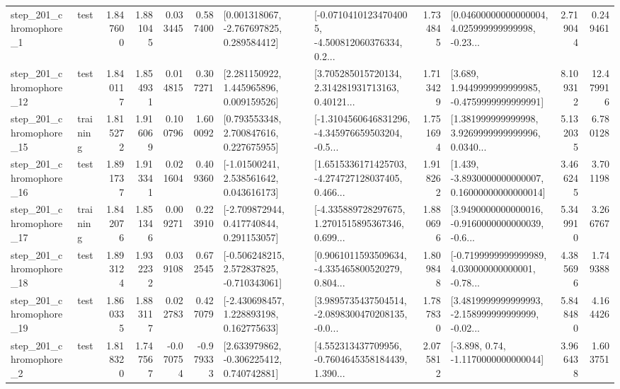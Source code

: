 \begin{tabular}{llrrrrllrlrr}
   step\_201\_chromophore\_1 &      test &      1.847600 &    1.881045 &      0.033445 &  0.587400 &    [0.001318067, -2.767697825, 0.289584412] &  [-0.07104101234704005, -4.500812060376334, 0.2... &       1.734845 &  [0.04600000000000004, 4.025999999999998, -0.23... &            2.719044 &          0.249461 \\
  step\_201\_chromophore\_12 &      test &      1.840117 &    1.854931 &      0.014815 &  0.307271 &     [2.281150922, 1.445965896, 0.009159526] &  [3.705285015720134, 2.314281931713163, 0.40121... &       1.713429 &   [3.689, 1.9449999999999985, -0.4759999999999991] &            8.109312 &         12.479916 \\
  step\_201\_chromophore\_15 &  training &      1.815272 &    1.916069 &      0.100796 &  1.600092 &     [0.793553348, 2.700847616, 0.227675955] &  [-1.3104560646831296, -4.345976659503204, -0.5... &       1.751694 &  [1.381999999999998, 3.9269999999999996, 0.0340... &            5.132035 &          6.780128 \\
  step\_201\_chromophore\_16 &      test &      1.891737 &    1.913341 &      0.021604 &  0.409360 &     [-1.01500241, 2.538561642, 0.043616173] &  [1.6515336171425703, -4.274727128037405, 0.466... &       1.918262 &  [1.439, -3.8930000000000007, 0.16000000000000014] &            3.466245 &          3.701198 \\
  step\_201\_chromophore\_17 &  training &      1.842076 &    1.851346 &      0.009271 &  0.223910 &    [-2.709872944, 0.417740844, 0.291153057] &  [-4.335889728297675, 1.2701515895367346, 0.699... &       1.880696 &  [3.9490000000000016, -0.9160000000000039, -0.6... &            5.349910 &          3.266767 \\
  step\_201\_chromophore\_18 &      test &      1.893124 &    1.932232 &      0.039108 &  0.672545 &   [-0.506248215, 2.572837825, -0.710343061] &  [0.9061011593509634, -4.335465800520279, 0.804... &       1.809848 &  [-0.7199999999999989, 4.030000000000001, -0.78... &            4.385696 &          1.749388 \\
  step\_201\_chromophore\_19 &      test &      1.860335 &    1.883117 &      0.022783 &  0.427079 &    [-2.430698457, 1.228893198, 0.162775633] &  [3.9895735437504514, -2.0898300470208135, -0.0... &       1.787830 &  [3.4819999999999993, -2.158999999999999, -0.02... &            5.848480 &          4.164426 \\
   step\_201\_chromophore\_2 &      test &      1.818320 &    1.747567 &     -0.070754 & -0.979333 &    [2.633979862, -0.306225412, 0.740742881] &  [4.552313437709956, -0.7604645358184439, 1.390... &       2.075812 &                [-3.898, 0.74, -1.1170000000000044] &            3.966438 &          1.603751 \\

\end{tabular}
